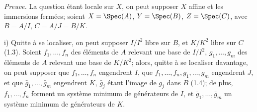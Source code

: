 \emph{Preuve.} La question étant locale sur $X$, on peut supposer $X$ affine et les immersions fermées; soient $X=\Spec(A)$, $Y=\Spec(B)$, $Z=\Spec(C)$, avec $B=A/I$, $C=A/J=B/K$.

i) Quitte à se localiser, on peut supposer $I/I^2$ libre sur $B$, et $K/K^2$ libre sur $C$ (1.3). Soient $f_1,\ldots,f_n$ des éléments de $A$ relevant une base de $I/I^2$, $g_1,\ldots,g_m$ des éléments de $A$ relevant une base de $K/K^2$; alors, quitte à se localiser davantage, on peut supposer que $f_1,\ldots,f_n$ engendrent $I$, que $f_1,\ldots,f_n,g_1,\ldots,g_m$ engendrent $J$, et que $\bar g_1,\ldots,\bar g_m$ engendrent $K$, $\bar g_j$ étant l'image de $g_j$ dans $B$ (1.4); de plus, $f_1,\ldots,f_n$ forment un système minimum de générateurs de $I$, et $\bar g_1,\ldots,\bar g_m$ un système minimum de générateurs de $K$.

